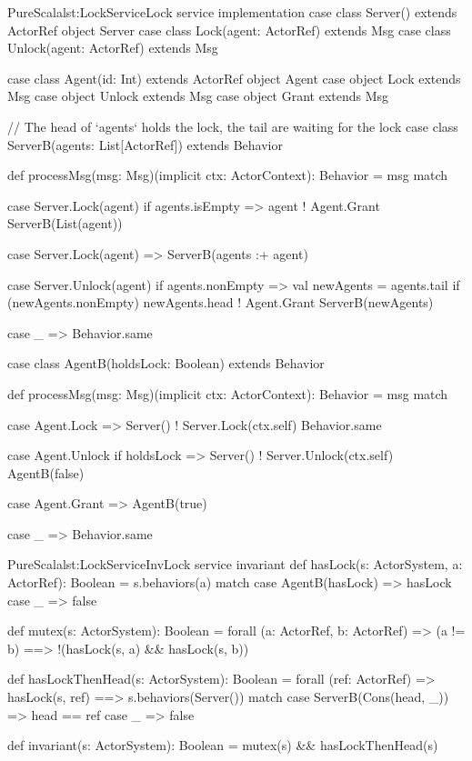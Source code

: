 \documentclass[a4paper,twoside]{article}
\begin{document}
\begin{Code}{PureScala}{lst:LockService}{Lock service implementation}
case class Server() extends ActorRef
object Server {
  case class Lock(agent: ActorRef) extends Msg
  case class Unlock(agent: ActorRef) extends Msg
}

case class Agent(id: Int) extends ActorRef
object Agent {
  case object Lock   extends Msg
  case object Unlock extends Msg
  case object Grant  extends Msg
}

// The head of `agents` holds the lock, the tail are waiting for the lock
case class ServerB(agents: List[ActorRef]) extends Behavior {
  def processMsg(msg: Msg)(implicit ctx: ActorContext): Behavior = msg match {
    case Server.Lock(agent) if agents.isEmpty =>
      agent ! Agent.Grant
      ServerB(List(agent))

    case Server.Lock(agent) =>
      ServerB(agents :+ agent)

    case Server.Unlock(agent) if agents.nonEmpty =>
      val newAgents = agents.tail
      if (newAgents.nonEmpty) newAgents.head ! Agent.Grant
      ServerB(newAgents)

    case _ =>
      Behavior.same
  }
}

case class AgentB(holdsLock: Boolean) extends Behavior {
  def processMsg(msg: Msg)(implicit ctx: ActorContext): Behavior = msg match {
    case Agent.Lock =>
      Server() ! Server.Lock(ctx.self)
      Behavior.same

    case Agent.Unlock if holdsLock =>
      Server() ! Server.Unlock(ctx.self)
      AgentB(false)

    case Agent.Grant =>
      AgentB(true)

    case _ =>
      Behavior.same
  }
}
\end{Code}

\begin{Code}{PureScala}{lst:LockServiceInv}{Lock service invariant}
def hasLock(s: ActorSystem, a: ActorRef): Boolean = {
  s.behaviors(a) match {
    case AgentB(hasLock) => hasLock
    case _ => false
  }
}

def mutex(s: ActorSystem): Boolean = forall { (a: ActorRef, b: ActorRef) =>
  (a != b) ==> !(hasLock(s, a) && hasLock(s, b))
}

def hasLockThenHead(s: ActorSystem): Boolean = forall { (ref: ActorRef) =>
  hasLock(s, ref) ==> {
    s.behaviors(Server()) match {
      case ServerB(Cons(head, _)) => head == ref
      case _ => false
    }
  }
}

def invariant(s: ActorSystem): Boolean = {
  mutex(s) && hasLockThenHead(s)
}
\end{Code}
\end{document}
